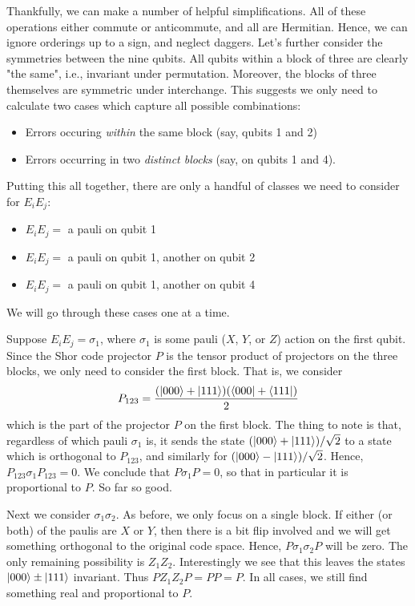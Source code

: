 \documentclass{book}
\begin{document}
    Thankfully, we can make a number of helpful simplifications. All of these operations either commute or anticommute, and all are Hermitian. Hence, we can ignore orderings up to a sign, and neglect daggers. Let's further consider the symmetries between the nine qubits. All qubits within a block of three are clearly "the same", i.e., invariant under permutation. Moreover, the blocks of three themselves are symmetric under interchange. This suggests we only need to calculate two cases which capture all possible combinations:
    \begin{itemize}
        \item Errors occuring \emph{within} the same block (say, qubits 1 and 2)
        \item Errors occurring in two \emph{distinct blocks} (say, on qubits 1 and 4).
    \end{itemize}

    Putting this all together, there are only a handful of classes we need to consider for $E_i E_j$: 
    \begin{itemize}
        \item $E_i E_j = $ a pauli on qubit 1
        \item $E_i E_j = $ a pauli on qubit 1, another on qubit 2
        \item $E_i E_j = $ a pauli on qubit 1, another on qubit 4
    \end{itemize}
    We will go through these cases one at a time. 

    Suppose $E_i E_j = \sigma_1$, where $\sigma_1$ is some pauli ($X$, $Y$, or $Z$) action on the first qubit. Since the Shor code projector $P$ is the tensor product of projectors on the three blocks, we only need to consider the first block. That is, we consider
    \begin{align}
        P_{123} = \frac{(\ket{000}+\ket{111})(\bra{000}+\bra{111})}{2}
    \end{align}
    which is the part of the projector $P$ on the first block. The thing to note is that, regardless of which pauli $\sigma_1$ is, it sends the state $(\ket{000} + \ket{111})/\sqrt{2}$ to a state which is orthogonal to $P_{123}$, and similarly for $(\ket{000} - \ket{111})/\sqrt{2}$. Hence, $P_{123} \sigma_1 P_{123} = 0$. We conclude that $P \sigma_1 P = 0$, so that in particular it is proportional to $P$. So far so good. 

    Next we consider $\sigma_1 \sigma_2$. As before, we only focus on a single block. If either (or both) of the paulis are $X$ or $Y$, then there is a bit flip involved and we will get something orthogonal to the original code space. Hence, $P \sigma_1 \sigma_2 P$ will be zero. The only remaining possibility is $Z_1 Z_2$. Interestingly we see that this leaves the states $\ket{000} \pm \ket{111}$ invariant. Thus $P Z_1 Z_2 P = P P = P$. In all cases, we still find something real and proportional to $P$.
\end{document}
